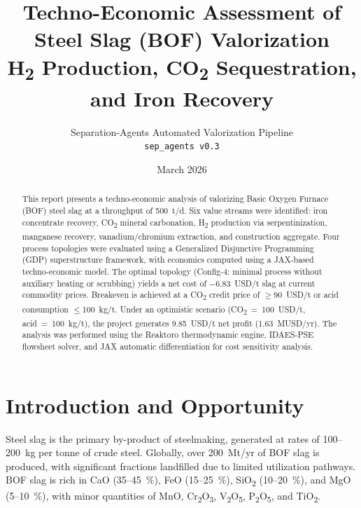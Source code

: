 \documentclass[11pt,a4paper]{article}
\title{\textbf{Techno-Economic Assessment of\\Steel Slag (BOF) Valorization}\\[8pt]
\large H\textsubscript{2} Production, CO\textsubscript{2} Sequestration, and Iron Recovery}
\author{Separation-Agents Automated Valorization Pipeline\\
\texttt{sep\_agents v0.3}}
\date{March 2026}
\begin{document}
\maketitle

\begin{abstract}
This report presents a techno-economic analysis of valorizing Basic Oxygen Furnace (BOF) steel slag at a throughput of \SI{500}{t/d}.
Six value streams were identified: iron concentrate recovery, CO\textsubscript{2} mineral carbonation, H\textsubscript{2} production via serpentinization, manganese recovery, vanadium/chromium extraction, and construction aggregate.
Four process topologies were evaluated using a Generalized Disjunctive Programming (GDP) superstructure framework, with economics computed using a JAX-based techno-economic model.
The optimal topology (Config-4: minimal process without auxiliary heating or scrubbing) yields a net cost of \SI{-6.83}{USD/t} slag at current commodity prices.
Breakeven is achieved at a CO\textsubscript{2} credit price of $\geq$\SI{90}{USD/t} or acid consumption $\leq$\SI{100}{kg/t}.
Under an optimistic scenario (CO\textsubscript{2}~=~\SI{100}{USD/t}, acid~=~\SI{100}{kg/t}), the project generates \SI{+9.85}{USD/t} net profit (\SI{1.63}{MUSD/yr}).
The analysis was performed using the Reaktoro thermodynamic engine, IDAES-PSE flowsheet solver, and JAX automatic differentiation for cost sensitivity analysis.
\end{abstract}

\tableofcontents
\newpage

\section{Introduction and Opportunity}

Steel slag is the primary by-product of steelmaking, generated at rates of \SI{100}{}--\SI{200}{kg} per tonne of crude steel.
Globally, over \SI{200}{Mt/yr} of BOF slag is produced, with significant fractions landfilled due to limited utilization pathways.
BOF slag is rich in CaO (\SI{35}{}--\SI{45}{\percent}), FeO (\SI{15}{}--\SI{25}{\percent}), SiO\textsubscript{2} (\SI{10}{}--\SI{20}{\percent}), and MgO (\SI{5}{}--\SI{10}{\percent}), with minor quantities of MnO, Cr\textsubscript{2}O\textsubscript{3}, V\textsubscript{2}O\textsubscript{5}, P\textsubscript{2}O\textsubscript{5}, and TiO\textsubscript{2}.
\end{document}
